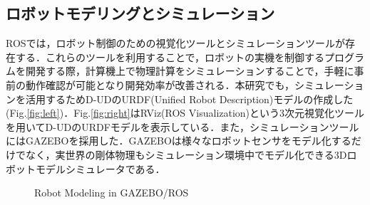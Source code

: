 \documentclass[12pt]{sonota/aislab}
\begin{document}
\subsection{ロボットモデリングとシミュレーション}
ROSでは，ロボット制御のための視覚化ツールとシミュレーションツールが存在する．これらのツールを利用することで，ロボットの実機を制御するプログラムを開発する際，計算機上で物理計算をシミュレーションすることで，手軽に事前の動作確認が可能となり開発効率が改善される．本研究でも，シミュレーションを活用するためD-UDのURDF(Unified
Robot Description)モデルの作成した(Fig.\ref{fig:left})．Fig.\ref{fig:right}はRViz(ROS Visualization)という3次元視覚化ツールを用いてD-UDのURDFモデルを表示している．また，シミュレーションツールにはGAZEBO\cite{GAZEBO}を採用した．GAZEBOは様々なロボットセンサをモデル化するだけでなく，実世界の剛体物理もシミュレーション環境中でモデル化できる3Dロボットモデルシミュレータである．

\begin{figure}[tbp]
	\begin{center}
	\hspace{5mm}
	\end{center}
	\caption{Robot Modeling in GAZEBO/ROS}
	\label{fig:Modeling}
\end{figure}
\end{document}
